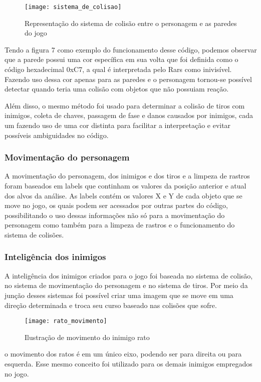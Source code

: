 \documentclass[conference]{IEEEtran}
\begin{document}
\begin{figure}[h]
\centering
\texttt{[image: sistema\_de\_colisao]}
\caption{Representação do sistema de colisão entre o personagem e as paredes do jogo}
\end{figure}  

Tendo a figura 7 como exemplo do funcionamento desse código, podemos observar que a parede possui uma cor específica em sua volta que foi definida como o código hexadecimal 0xC7, a qual é interpretada pelo Rars como inivisível. Fazendo uso dessa cor apenas para as paredes e o personagem tornou-se possível detectar quando teria uma colisão com objetos que não possuiam reação.

Além disso, o mesmo método foi usado para determinar a colisão de tiros com inimigos, coleta de chaves, passagem de fase e danos causados por inimigos, cada um fazendo uso de uma cor distinta para facilitar a interpretação e evitar possíveis ambiguidades no código.
\subsubsection{Movimentação do personagem} 
  A movimentação do personagem, dos inimigos e dos tiros e a limpeza de rastros foram baseados em labels que continham  os valores da posição anterior e atual dos alvos da análise. As labels contém os valores X e Y de cada objeto que se move no jogo, os quais podem ser acessados por outras partes do código, possibilitando o uso dessas informações não só para a movimentação do personagem como também para a limpeza de rastros e o funcionamento do sistema de colisões.
  
\subsubsection{Inteligência dos inimigos} 
A inteligência dos inimigos criados para o jogo foi baseada no sistema de colisão, no sistema de movimentação do personagem e no sistema de tiros. Por meio da junção desses sistemas foi possível criar uma imagem que se move em uma direção determinada e troca seu curso baseado nas colisões que sofre.

\begin{figure}[h]
\centering
\texttt{[image: rato\_movimento]}
\caption{Ilustração de movimento do inimigo rato}
\end{figure}  

o movimento dos ratos é em um único eixo, podendo ser para direita ou para esquerda. Esse mesmo conceito foi utilizado para os demais inimigos empregados no jogo.
 
\end{document}
